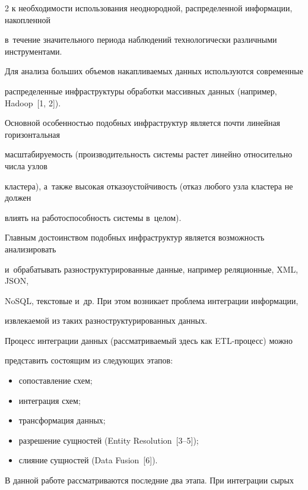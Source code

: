\begin{multicols}{2}
к необходимости использования неоднородной, распределенной информации, накопленной

в~течение значительного периода наблюдений технологически различными инструментами.



  Для анализа больших объемов накапливаемых данных используются современные

распределенные инфраструктуры обработки массивных данных (например, Hadoop~[1, 2]).

Основной особенностью подобных инфраструктур является почти линейная горизонтальная

масштабируемость (производительность системы растет линейно относительно числа узлов

кластера), а~также высокая отказоустойчивость (отказ любого узла кластера не должен

влиять на работоспособность системы в~целом).



  Главным достоинством подобных инфраструктур является возможность анализировать

и~обрабатывать разноструктурированные данные, например реляционные, XML, JSON,

NoSQL, текстовые и~др. При этом возникает проблема интеграции информации,

извлекаемой из таких разноструктурированных данных.



  Процесс интеграции данных (рассматриваемый здесь как ETL-про\-цесс) можно

представить состоящим из следующих этапов:

  \begin{itemize}

\item сопоставление схем;

\item интеграция схем;

\item трансформация данных;

\item разрешение сущностей (Entity Resolution~[3--5]);

\item слияние сущностей (Data Fusion~[6]).

\end{itemize}



  В данной работе рассматриваются последние два этапа. При интеграции сырых


\end{multicols}
